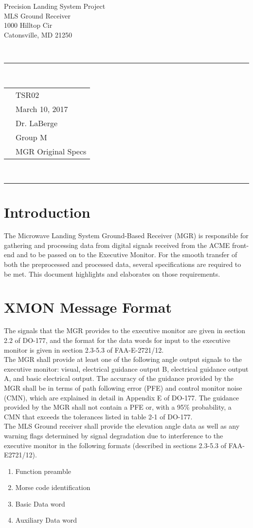 \documentclass[11pt]{article}
\newcommand{\header}[5]{
	\begin{centering}
		\parbox{6.8in}{
		\begin{flushright}
		\begin{spacing}{.8}{
		\fontfamily{cmss}{\large{\textbf{#1}}\\}}
		\small{
			#2\\
			#3\\
			#4\\
			#5}\\
		\end{spacing}
		\end{flushright}
		\vspace{-7.5mm}
		}\\
		\rule{\textwidth}{0.5pt}\\
		\vspace{-4mm}
	\end{centering}
}
\newcommand{\documentinfo}[5]{
	\begin{centering}
		\parbox{6.8in}{
		\begin{spacing}{1}
			\begin{flushleft}
				\begin{tabular}{l l}
					\fontfamily{cmss}{\textbf{DOC \#: }} & #1 \\
					\fontfamily{cmss}{\textbf{DATE: }} & #2 \\
					\fontfamily{cmss}{\textbf{TO: }} & #3 \\
					\fontfamily{cmss}{\textbf{FROM: }} & #4 \\
					\fontfamily{cmss}{\textbf{SUBJECT: }} & #5 \\
				\end{tabular}\\
				\rule{\textwidth}{1pt}
			\end{flushleft}
		\end{spacing}
		}
	\end{centering}
}
\begin{document}
\header{CMPE349}{Precision Landing System Project}{MLS Ground Receiver}{1000 Hilltop Cir}{Catonsville, MD 21250}

\documentinfo{TSR02}{March 10, 2017}{Dr. LaBerge}{Group M}{MGR Original Specs}

	\section{Introduction}
	The Microwave Landing System Ground-Based Receiver (MGR) is responsible for gathering and processing data from digital signals received from the ACME front-end and to be passed on to the Executive Monitor. For the smooth transfer of both the preprocessed and processed data, several specifications are required to be met. This document highlights and elaborates on those requirements.

	\section{XMON Message Format}
	The signals that the MGR provides to the executive monitor are given in section 2.2 of DO-177, and the format for the data words for input to the executive monitor is given in section 2.3-5.3 of FAA-E-2721/12.\\
	The MGR shall provide at least one of the following angle output signals to the executive monitor: visual, electrical guidance output B, electrical guidance output A, and basic electrical output. The accuracy of the guidance provided by the MGR shall be in terms of path following error (PFE) and control monitor noise (CMN), which are explained in detail in Appendix E of DO-177. The guidance provided by the MGR shall not contain a PFE or, with a 95\% probability, a CMN that exceeds the tolerances listed in table 2-1 of DO-177.\\
	The MLS Ground receiver shall provide the elevation angle data as well as any warning flags determined by signal degradation due to interference to the executive monitor in the following formats (described in sections 2.3-5.3 of FAA-E2721/12).

		\begin{enumerate}

			\item Function preamble

			\item Morse code identification

			\item Basic Data word

			\item Auxiliary Data word

		\end{enumerate}
\end{document}
